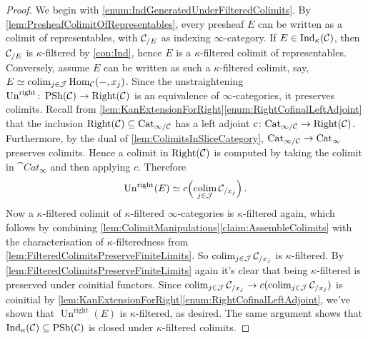 \begin{proof}
	We begin with \cref{enum:IndGeneratedUnderFilteredColimits}. By \cref{lem:PresheafColimitOfRepresentables}, every presheaf $E$ can be written as a colimit of representables, with $\mathcal{C}_{/E}$ as indexing $\infty$-category. If $E\in\mathrm{Ind}_\kappa(\mathcal{C})$, then $\mathcal{C}_{/E}$ is $\kappa$-filtered by \cref{con:Ind}, hence $E$ is a $\kappa$-filtered colimit of representables. Conversely, assume $E$ can be written as such a $\kappa$-filtered colimit, say, $E\simeq\operatorname*{colim}_{j\in\mathcal{J}}\operatorname{Hom}_{\mathcal{C}}(-,x_j)$. Since the unstraightening $\operatorname{Un}^{\mathrm{right}}\colon \operatorname{PSh}(\mathcal{C})\rightarrow\mathrm{Right}(\mathcal{C})$ is an equivalence of $\infty$-categories, it preserves colimits. Recall from \cref{lem:KanExtensionForRight}\cref{enum:RightCofinalLeftAdjoint} that the inclusion $\mathrm{Right}(\mathcal{C})\subseteq\mathrm{Cat}_{\infty/\mathcal{C}}$ has a left adjoint $c\colon \mathrm{Cat}_{\infty/\mathcal{C}}\rightarrow\mathrm{Right}(\mathcal{C})$. Furthermore, by the dual of \cref{lem:ColimitsInSliceCategory}, $\mathrm{Cat}_{\infty/\mathcal{C}}\rightarrow\operatorname{Cat}_\infty$ preserves colimits. Hence a colimit in $\mathrm{Right}(\mathcal{C})$ is computed by taking the colimit in $\cat{Cat}_\infty$ and then applying $c$. Therefore
	\begin{equation*}
		\operatorname{Un}^{\mathrm{right}}(E)\simeq c\Bigl(\operatorname*{colim}_{j\in\mathcal{J}}\mathcal{C}_{/x_j}\Bigr)\,.
	\end{equation*}
	Now a $\kappa$-filtered colimit of $\kappa$-filtered $\infty$-categories is $\kappa$-filtered again, which follows by combining \cref{lem:ColimitManipulations}\cref{claim:AssembleColimits} with the characterisation of $\kappa$-filteredness from \cref{lem:FilteredColimitsPreserveFiniteLimits}. So $\operatorname*{colim}_{j\in\mathcal{J}}\mathcal{C}_{/x_j}$ is $\kappa$-filtered. By \cref{lem:FilteredColimitsPreserveFiniteLimits} again it's clear that being $\kappa$-filtered is preserved under coinitial functors. Since $\operatorname*{colim}_{j\in\mathcal{J}}\mathcal{C}_{/x_j}\rightarrow c(\operatorname*{colim}_{j\in\mathcal{J}}\mathcal{C}_{/x_j})$ is coinitial by \cref{lem:KanExtensionForRight}\cref{enum:RightCofinalLeftAdjoint}, we've shown that $\operatorname{Un}^{\mathrm{right}}(E)$ is $\kappa$-filtered, as desired. The same argument shows that $\mathrm{Ind}_\kappa(\mathcal{C})\subseteq \operatorname{PSh}(\mathcal{C})$ is closed under $\kappa$-filtered colimits.
	

\end{proof}
